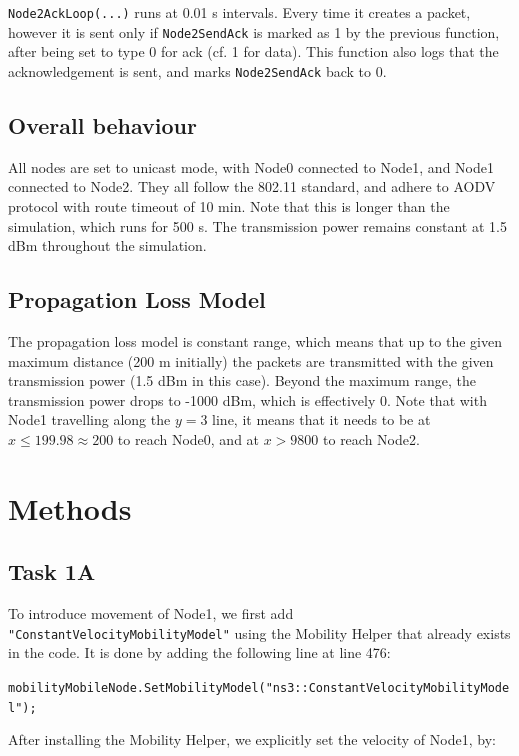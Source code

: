 \documentclass[11pt,journal]{article}
\begin{document}
	\texttt{Node2AckLoop(...)} runs at 0.01 s intervals. Every time it creates a packet, however it is sent only if \texttt{Node2SendAck} is marked as 1 by the previous function, after being set to type 0 for ack (cf. 1 for data). This function also logs that the acknowledgement is sent, and marks \texttt{Node2SendAck} back to 0.
	
	\subsection{Overall behaviour}
	
	All nodes are set to unicast mode, with Node0 connected to Node1, and Node1 connected to Node2. They all follow the 802.11 standard, and adhere to AODV protocol with route timeout of 10 min. Note that this is longer than the simulation, which runs for 500 s. The transmission power remains constant at 1.5 dBm throughout the simulation. 
	
	\subsection{Propagation Loss Model}
	
	The propagation loss model is constant range, which means that up to the given maximum distance (200 m initially) the packets are transmitted with the given transmission power (1.5 dBm in this case). Beyond the maximum range, the transmission power drops to -1000 dBm, which is effectively 0\cite{range loss doc}. Note that with Node1 travelling along the $y=3$ line, it means that it needs to be at $x \leq 199.98 \approx 200$ to reach Node0, and at $ x > 9800$ to reach Node2.
	
	\section{Methods}
	\subsection{Task 1A}
	To introduce movement of Node1, we first add \texttt{"ConstantVelocityMobilityModel"} using the Mobility Helper that already exists in the code. It is done by adding the following line at line 476:
	
	\texttt{mobilityMobileNode.SetMobilityModel("ns3::ConstantVelocityMobilityModel");}
	
	
	After installing the Mobility Helper, we explicitly set the velocity of Node1, by:
	
\end{document}
